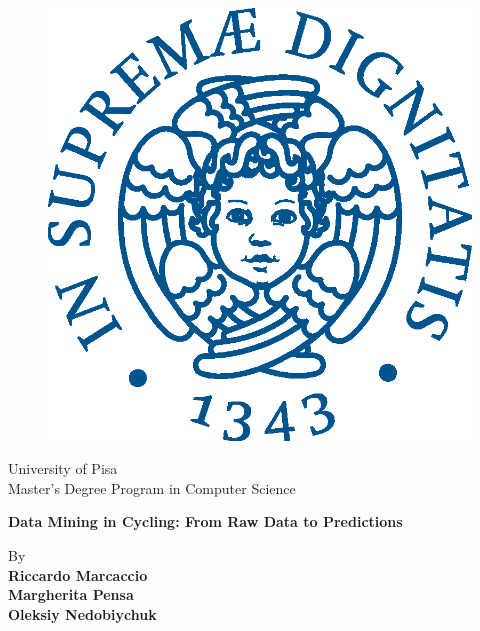 \begin{titlepage}
\begin{figure}[!htb]
    \centering
    \includegraphics[keepaspectratio=true,scale=0.5]{assets/cherubino_pant541.eps}
\end{figure}

\begin{center}
    \LARGE{University of Pisa}
    \vspace{5mm}
    \\ \LARGE{Master's Degree Program in Computer Science}
    
\end{center}

\vspace{15mm}
\begin{center}
    {\LARGE{\bf Data Mining in Cycling: From Raw Data to Predictions}}
    \vspace{10mm}
    
    \large{By}{\normalsize\vspace{3mm}
    \bf\\ \large{Riccardo Marcaccio \vspace{2mm}\\Margherita Pensa \vspace{2mm}\\Oleksiy Nedobiychuk}}
\end{center}


\end{titlepage}